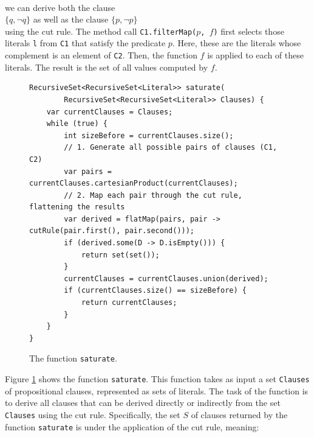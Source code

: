 \begin{enumerate}
      \\[0.2cm]
      we can derive both the clause
      \\[0.2cm]
      \hspace*{1.3cm}
      $\{q, \neg q\}$ \quad as well as the clause \quad $\{p, \neg p \}$
      \\[0.2cm]
      using the cut rule.  The method call \texttt{C1.filterMap($p$, $f$)} first selects those literals
      \texttt{l} from \texttt{C1} that satisfy the predicate $p$.  Here, these are the literals whose complement
      is an element of \texttt{C2}.  Then, the function $f$ is applied to each of these literals.  The result is
      the set of all values computed by $f$.
\end{enumerate}

\begin{figure}[!ht]
\centering
\begin{verbatim}
RecursiveSet<RecursiveSet<Literal>> saturate(
        RecursiveSet<RecursiveSet<Literal>> Clauses) {
    var currentClauses = Clauses;
    while (true) {
        int sizeBefore = currentClauses.size();
        // 1. Generate all possible pairs of clauses (C1, C2)
        var pairs = currentClauses.cartesianProduct(currentClauses);
        // 2. Map each pair through the cut rule, flattening the results
        var derived = flatMap(pairs, pair -> cutRule(pair.first(), pair.second()));
        if (derived.some(D -> D.isEmpty())) {
            return set(set());
        }
        currentClauses = currentClauses.union(derived);
        if (currentClauses.size() == sizeBefore) {
            return currentClauses;
        }
    }
}
\end{verbatim}
\vspace*{-0.3cm}
\caption{The function \texttt{saturate}.}
\label{fig:Completeness.ipynb-2}
\end{figure}
Figure \ref{fig:Completeness.ipynb-2} shows the function \texttt{saturate}. This function takes
as input a set \texttt{Clauses} of propositional clauses, represented as sets of literals.
The task of the function is to derive all clauses that can be derived directly or indirectly from the set \texttt{Clauses}
using the cut rule. Specifically, the set $S$ of clauses returned by the function \texttt{saturate}
is  under the application of the cut rule, meaning:

